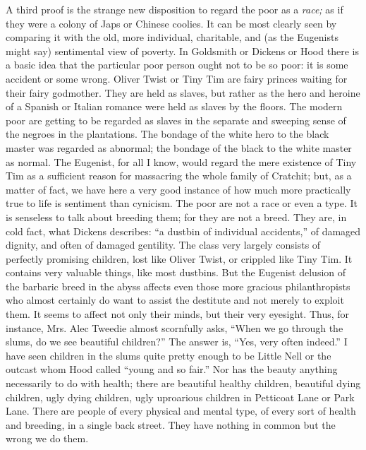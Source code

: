 \documentclass{book}
\begin{document}
A third proof is the strange new disposition to regard the poor as a \emph{race;} as if they were a colony of Japs or Chinese coolies. It can be most clearly seen by comparing it with the old, more individual, charitable, and (as the Eugenists might say) sentimental view of poverty. In Goldsmith or Dickens or Hood there is a basic idea that the particular poor person ought not to be so poor: it is some accident or some wrong. Oliver Twist or Tiny Tim are fairy princes waiting for their fairy godmother. They are held as slaves, but rather as the hero and heroine of a Spanish or Italian romance were held as slaves by the floors. The modern poor are getting to be regarded as slaves in the separate and sweeping sense of the negroes in the plantations. The bondage of the white hero to the black master was regarded as abnormal; the bondage of the black to the white master as normal. The Eugenist, for all I know, would regard the mere existence of Tiny Tim as a sufficient reason for massacring the whole family of Cratchit; but, as a matter of fact, we have here a very good instance of how much more practically true to life is sentiment than cynicism. The poor are not a race or even a type. It is senseless to talk about breeding them; for they are not a breed. They are, in cold fact, what Dickens describes: “a dustbin of individual accidents,” of damaged dignity, and often of damaged gentility. The class very largely consists of perfectly promising children, lost like Oliver Twist, or crippled like Tiny Tim. It contains very valuable things, like most dustbins. But the Eugenist delusion of the barbaric breed in the abyss affects even those more gracious philanthropists who almost certainly do want to assist the destitute and not merely to exploit them. It seems to affect not only their minds, but their very eyesight. Thus, for instance, Mrs. Alec Tweedie almost scornfully asks, “When we go through the slums, do we see beautiful children?” The answer is, “Yes, very often indeed.” I have seen children in the slums quite pretty enough to be Little Nell or the outcast whom Hood called “young and so fair.” Nor has the beauty anything necessarily to do with health; there are beautiful healthy children, beautiful dying children, ugly dying children, ugly uproarious children in Petticoat Lane or Park Lane. There are people of every physical and mental type, of every sort of health and breeding, in a single back street. They have nothing in common but the wrong we do them.
\end{document}
